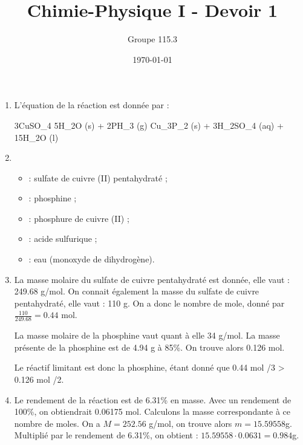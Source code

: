 \documentclass{article}
\title{Chimie-Physique I - Devoir 1}
\author{Groupe 115.3}
\date{\today}
\begin{document}
\maketitle
\begin{enumerate}
	\item 
		L'\'equation de la r\'eaction est donn\'ee par :
		\begin{chemmath}
			3CuSO_4 \cdot 5H_2O (s) + 2PH_3 (g) \longrightarrow Cu_3P_2 (s) + 3H_2SO_4 (aq) + 15H_2O (l)
		\end{chemmath}
	\item 
		\begin{itemize}
			\item {} : sulfate de cuivre (II) pentahydrat\'e ;
			\item {} : phosphine ;
			\item {} : phosphure de cuivre (II) ;
			\item {} : acide sulfurique ;
			\item {} : eau (monoxyde de dihydrog\`ene).
		\end{itemize}
	\item
		La masse molaire du sulfate de cuivre pentahydrat\'e est donn\'ee, elle vaut : 249.68 g/mol. On connait 			\'egalement la masse du sulfate de cuivre pentahydrat\'e, elle vaut : 110 g. On a donc le nombre de mole, donn\'e par $\frac{110}{249.68} = 0.44$ mol.
		
		La masse molaire de la phosphine vaut quant \`a elle 34 g/mol. La masse pr\'esente de la phosphine est de 4.94 g \`a 85\%. On trouve alors 0.126 mol.
		
		Le r\'eactif limitant est donc la phosphine, \'etant donn\'e que 0.44 mol /3 > 0.126 mol /2. 
		
	\item
		Le rendement de la r\'eaction est de 6.31\% en masse. Avec un rendement de 100\%, on obtiendrait 0.06175 mol. Calculons la masse correspondante à ce nombre de moles. On a $M = 252.56$ g/mol, on trouve alors $m = 15.59558$g. Multipli\'e par le rendement de 6.31\%, on obtient : $15.59558 \cdot 0.0631 = 0.984$g.
\end{enumerate}
\end{document}
